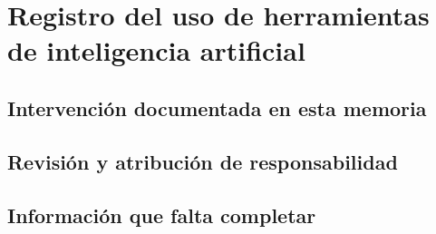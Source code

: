 \chapter{Registro del uso de herramientas de inteligencia artificial}
\label{anx:uso-ia}

\section{Intervención documentada en esta memoria}

\section{Revisión y atribución de responsabilidad}

\section{Información que falta completar}
